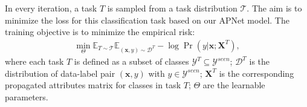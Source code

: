 \documentclass[letterpaper]{article} %
\def\Eqref#1{Eq.~\eqref{#1}}
\def\vs{{\bm{s}}}
\def\vx{{\bm{x}}}
\def\mS{{\bm{S}}}
\def\mX{{\bm{X}}}
\def\gD{{\mathcal{D}}}
\def\gT{{\mathcal{T}}}
\def\sE{{\mathbb{E}}}
\begin{document}
In every iteration, a task $T$ is sampled from a task distribution $\gT$. The aim is to minimize the loss for this classification task based on our APNet model.
The training objective is to minimize the empirical risk:
\begin{align}\label{equ:opt-obj-all}
\min_\Theta{\sE}_{T\sim\gT}{\sE}_{(\vx, y)\sim\gD^{T}} -\log\Pr(y|\vx;\mX^{T}),
\end{align}
where each task $T$ is defined as a subset of classes $\mathcal Y^T\subseteq \mathcal Y^{seen}$; $\mathcal D^{T}$ is the distribution of data-label pair $(\vx,y)$ with $y\in \mathcal Y^{seen}$; $\mX^{T}$ is the corresponding propagated attributes matrix for classes in task $T$; $\Theta$ are the learnable parameters.


\end{document}
